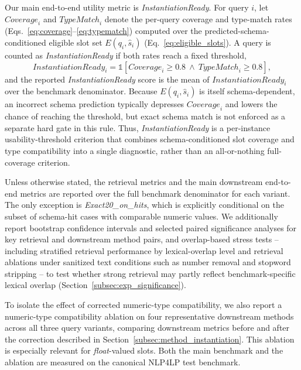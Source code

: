 \documentclass[pdflatex,sn-basic,Numbered]{sn-jnl}
\begin{document}
Our main end-to-end utility metric is \textit{InstantiationReady}. For query $i$, let $\mathit{Coverage}_i$ and $\mathit{TypeMatch}_i$ denote the per-query coverage and type-match rates (Eqs.~\eqref{eq:coverage}--\eqref{eq:typematch}) computed over the predicted-schema-conditioned eligible slot set $E(q_i,\hat{s}_i)$ (Eq.~\eqref{eq:eligible_slots}). A query is counted as \textit{InstantiationReady} if both rates reach a fixed threshold,
\begin{equation}
\mathit{InstantiationReady}_i = \mathbb{1}\!\left[\mathit{Coverage}_i \geq 0.8 \ \wedge\ \mathit{TypeMatch}_i \geq 0.8\right],
\label{eq:instantiation_ready}
\end{equation}
and the reported \textit{InstantiationReady} score is the mean of $\mathit{InstantiationReady}_i$ over the benchmark denominator. Because $E(q_i,\hat{s}_i)$ is itself schema-dependent, an incorrect schema prediction typically depresses $\mathit{Coverage}_i$ and lowers the chance of reaching the threshold, but exact schema match is not enforced as a separate hard gate in this rule. Thus, \textit{InstantiationReady} is a per-instance usability-threshold criterion that combines schema-conditioned slot coverage and type compatibility into a single diagnostic, rather than an all-or-nothing full-coverage criterion.

Unless otherwise stated, the retrieval metrics and the main downstream end-to-end metrics are reported over the full benchmark denominator for each variant. The only exception is \textit{Exact20\_on\_hits}, which is explicitly conditional on the subset of schema-hit cases with comparable numeric values. We additionally report bootstrap confidence intervals and selected paired significance analyses for key retrieval and downstream method pairs, and overlap-based stress tests -- including stratified retrieval performance by lexical-overlap level and retrieval ablations under sanitized text conditions such as number removal and stopword stripping -- to test whether strong retrieval may partly reflect benchmark-specific lexical overlap (Section~\ref{subsec:exp_significance}).

To isolate the effect of corrected numeric-type compatibility, we also report a numeric-type compatibility ablation on four representative downstream methods across all three query variants, comparing downstream metrics before and after the correction described in Section~\ref{subsec:method_instantiation}. This ablation is especially relevant for \emph{float}-valued slots. Both the main benchmark and the ablation are measured on the canonical \textsc{NLP4LP} test benchmark.
\end{document}
